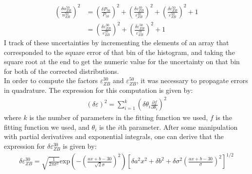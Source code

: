 \begin{align}
		\left(\frac{\delta n_{ZB}^{50}}{n_{ZB}^{50}}\right)^2&=\left( \frac{\delta P_{50}}{P_{50}} \right)^2+\left( \frac{\delta \varepsilon_{ZB}^{30}}{\varepsilon_{ZB}^{30}} \right)^2+\left( \frac{\delta \varepsilon_{ZB}^{50}}{\varepsilon_{ZB}^{50}} \right)^2+1\\
&=\left( \frac{\delta \varepsilon_{ZB}^{30}}{\varepsilon_{ZB}^{30}} \right)^2+\left( \frac{\delta \varepsilon_{ZB}^{50}}{\varepsilon_{ZB}^{50}} \right)^2+1
\end{align}
I track of these uncertainties by incrementing the elements of an array that corresponded to the square error of that bin of the histogram, and taking the square root at the end to get the numeric value for the uncertainty on that bin for both of the corrected distributions.\\
In order to compute the factors $\varepsilon_{ZB}^{30}$ and $\varepsilon_{ZB}^{50}$, it was necessary to propagate errors in quadrature. The expression for this computation is given by:
\begin{align}
		(\delta \varepsilon)^2=\sum_{i=1}^k\left( \delta \theta_i \frac{\partial f}{\partial \theta_i} \right)^2
\end{align}
where $k$ is the number of parameters in the fitting function we used, $f$ is the fitting function we used, and $\theta_i$ is the $i$th parameter.
After some manipulation with partial derivatives and exponential integrals, one can derive that the expression for $\delta \varepsilon_{ZB}^{30}$ is given by:
\begin{align}
		\delta \varepsilon_{ZB}^{30}=\sqrt{\frac{1}{2\pi\sigma^2}}\textrm{exp}\left(-\left( \frac{ax+b-30}{\sqrt{2}\sigma} \right)^2\right)\left[ \delta a^2x^2+\delta b^2 +\delta \sigma^2 \left( \frac{ax+b-30}{\sigma} \right)^2 \right]^{1/2}
\end{align}

